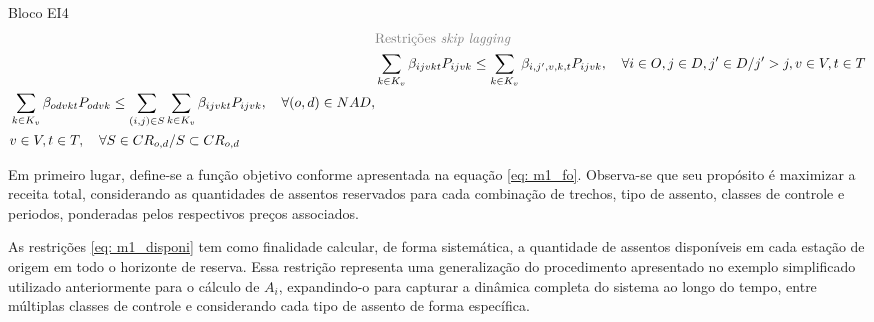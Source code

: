 \begin{bloque4}{Bloco \hypertarget{frase:EI4}{EI4}}
\allowdisplaybreaks
\begin{align}
	& \textcolor{gray}{\text{Restrições \textit{skip lagging}}} \notag   \\  
	& \sum_{k \in K_v}\beta_{ijvkt}P_{ijvk} \leq \sum_{k \in K_v}\beta_{i,j',v,k,t}P_{ijvk}, \quad \forall i \in O, j \in D, j' \in D / j' > j, v \in V, t \in T    \label{eq: m1_preco_estacao_inicio}                      \\
	\begin{split}
		& \sum_{k \in K_v}\beta_{odvkt}P_{odvk} \leq \sum_{(i,j) \in S}\sum_{k \in K_v}\beta_{ijvkt}P_{ijvk}, \quad    \forall (o,d) \in NAD, \\
		& v \in V, t \in T , \quad  \forall S \in CR_{o,d} / S \subset CR_{o,d}                                                               \\
	\end{split}   \label{eq: m1_preco_combinacao_rotas_contidas}
\end{align}
\end{bloque4}



Em primeiro lugar, define-se a função objetivo conforme apresentada na equação \eqref{eq: m1_fo}. Observa-se que seu propósito é maximizar a receita total, considerando as quantidades de assentos reservados para cada combinação de trechos, tipo de assento, classes de controle e periodos, ponderadas pelos respectivos preços associados.

As restrições \eqref{eq: m1_disponi} tem como finalidade calcular, de forma sistemática, a quantidade de assentos disponíveis em cada estação de origem em todo o horizonte de reserva. Essa restrição representa uma generalização do procedimento apresentado no exemplo simplificado utilizado anteriormente para o cálculo de $A_{i}$, expandindo-o para capturar a dinâmica completa do sistema ao longo do tempo, entre múltiplas classes de controle e considerando cada tipo de assento de forma específica.

